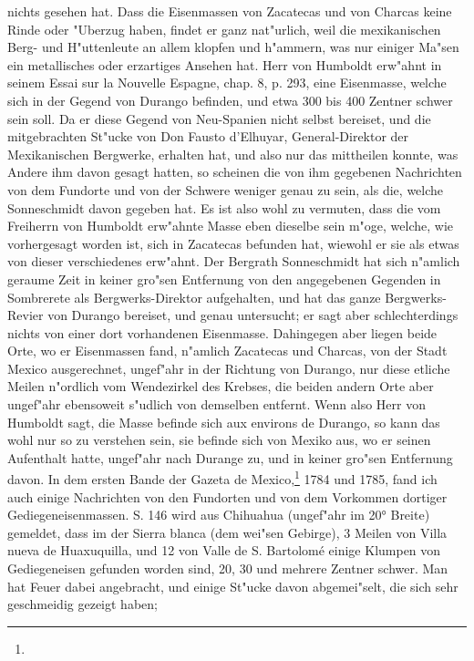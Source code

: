 \documentclass[a4paper, 11pt, oneside, polutonikogreek, german]{article}
\begin{document}
nichts gesehen hat. Dass die Eisenmassen von Zacatecas und von Charcas keine Rinde oder "Uberzug haben, findet er ganz nat"urlich, weil die mexikanischen Berg- und H"uttenleute an allem klopfen und h"ammern, was nur einiger Ma"sen ein metallisches oder erzartiges Ansehen hat. Herr von Humboldt erw"ahnt in seinem Essai sur la Nouvelle Espagne, chap. 8, p. 293, eine Eisenmasse, welche sich in der Gegend von Durango befinden, und etwa 300 bis 400 Zentner schwer sein soll. Da er diese Gegend von Neu-Spanien nicht selbst bereiset, und die mitgebrachten St"ucke von Don Fausto d'Elhuyar, General-Direktor der Mexikanischen Bergwerke, erhalten hat, und also nur das mittheilen konnte, was Andere ihm davon gesagt hatten, so scheinen die von ihm gegebenen Nachrichten von dem Fundorte und von der Schwere weniger genau zu sein, als die, welche Sonneschmidt davon gegeben hat. Es ist also wohl zu vermuten, dass die vom Freiherrn von Humboldt erw"ahnte Masse eben dieselbe sein m"oge, welche, wie vorhergesagt worden ist, sich in Zacatecas befunden hat, wiewohl er sie als etwas von dieser verschiedenes erw"ahnt. Der Bergrath Sonneschmidt hat sich n"amlich geraume Zeit in keiner gro"sen Entfernung von den angegebenen Gegenden in Sombrerete als Bergwerks-Direktor aufgehalten, und hat das ganze Bergwerks-Revier von Durango bereiset, und genau untersucht; er sagt aber schlechterdings nichts von einer dort vorhandenen Eisenmasse. Dahingegen aber liegen beide Orte, wo er Eisenmassen fand, n"amlich Zacatecas und Charcas, von der Stadt Mexico ausgerechnet, ungef"ahr in der Richtung von Durango, nur diese etliche Meilen n"ordlich vom Wendezirkel des Krebses, die beiden andern Orte aber ungef"ahr ebensoweit s"udlich von demselben entfernt. Wenn also Herr von Humboldt sagt, die Masse befinde sich aux environs de Durango, so kann das wohl nur so zu verstehen sein, sie befinde sich von Mexiko aus, wo er seinen Aufenthalt hatte, ungef"ahr nach Durange zu, und in keiner gro"sen Entfernung davon. In dem ersten Bande der Gazeta de Mexico,\footnote{} 1784 und 1785, fand ich auch einige Nachrichten von den Fundorten und von dem Vorkommen dortiger Gediegeneisenmassen. S. 146 wird aus Chihuahua (ungef"ahr im 20° Breite) gemeldet, dass im der Sierra blanca (dem wei"sen Gebirge), 3 Meilen von Villa nueva de Huaxuquilla, und 12 von Valle de S. Bartolomé einige Klumpen von Gediegeneisen gefunden worden sind, 20, 30 und mehrere Zentner schwer. Man hat Feuer dabei angebracht, und einige St"ucke davon abgemei"selt, die sich sehr geschmeidig gezeigt haben; 
\end{document}

